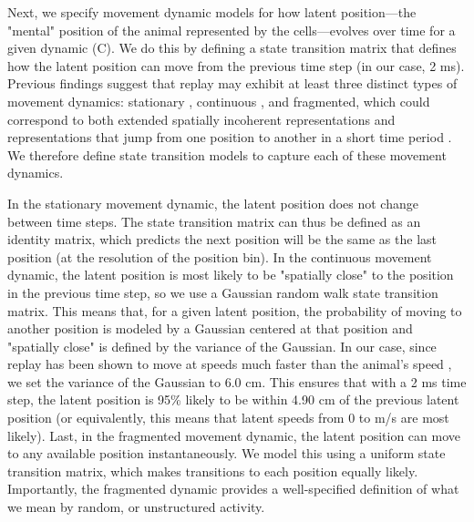 \documentclass[9pt,lineno]{elife}
\begin{document}
Next, we specify movement dynamic models for how latent position---the "mental" position of the animal represented by the cells---evolves over time for a given dynamic (C). We do this by defining a state transition matrix that defines how the latent position can move from the previous time step (in our case, 2 ms). Previous findings suggest that replay may exhibit at least three distinct types of movement dynamics: stationary \citep{YuDistincthippocampalcorticalmemory2017, FarooqEmergencepreconfiguredplastic2019}, continuous \citep{DavidsonHippocampalReplayExtended2009}, and fragmented, which could correspond to both extended spatially incoherent representations and representations that jump from one position to another in a short time period \citep{PfeifferAutoassociativedynamicsgeneration2015}. We therefore define state transition models to capture each of these movement dynamics.

In the stationary movement dynamic, the latent position does not change between time steps. The state transition matrix can thus be defined as an identity matrix, which predicts the next position will be the same as the last position (at the resolution of the position bin). In the continuous movement dynamic, the latent position is most likely to be "spatially close" to the position in the previous time step, so we use a Gaussian random walk state transition matrix. This means that, for a given latent position, the probability of moving to another position is modeled by a Gaussian centered at that position and "spatially close" is defined by the variance of the Gaussian. In our case, since replay has been shown to move at speeds much faster than the animal's speed \citep{DavidsonHippocampalReplayExtended2009, PfeifferAutoassociativedynamicsgeneration2015}, we set the variance of the Gaussian to 6.0 cm. This ensures that with a 2 ms time step, the latent position is 95\% likely to be within 4.90 cm of the previous latent position (or equivalently, this means that latent speeds from 0 to  m/s are most likely). Last, in the fragmented movement dynamic, the latent position can move to any available position instantaneously. We model this using a uniform state transition matrix, which makes transitions to each position equally likely. Importantly, the fragmented dynamic provides a well-specified definition of what we mean by random, or unstructured activity.
\end{document}
